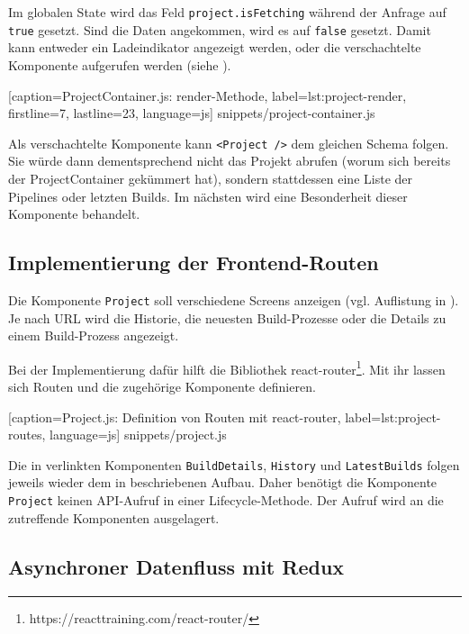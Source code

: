 Im globalen State wird das Feld \texttt{project.isFetching} während der Anfrage auf \texttt{true} gesetzt. Sind die Daten angekommen, wird es auf \texttt{false} gesetzt. Damit kann entweder ein Ladeindikator angezeigt werden, oder die verschachtelte Komponente aufgerufen werden (siehe ).


  [caption={ProjectContainer.js: render-Methode},
  label={lst:project-render},
  firstline=7,
  lastline=23,
  language=js]
  {snippets/project-container.js}

Als verschachtelte Komponente kann \texttt{<Project />} dem gleichen Schema folgen. Sie würde dann dementsprechend nicht das Projekt abrufen (worum sich bereits der ProjectContainer gekümmert hat), sondern stattdessen eine Liste der Pipelines oder letzten Builds. Im nächsten  wird eine Besonderheit dieser Komponente behandelt.

\subsection{Implementierung der Frontend-Routen}
\label{subsec:react-routes}

Die Komponente \texttt{Project} soll verschiedene Screens anzeigen (vgl. Auflistung in ). Je nach \acs{URL} wird die Historie, die neuesten Build-Prozesse oder die Details zu einem Build-Prozess angezeigt.

Bei der Implementierung dafür hilft die Bibliothek react-router\footnote{https://reacttraining.com/react-router/}. Mit ihr lassen sich Routen und die zugehörige Komponente definieren.


  [caption={Project.js: Definition von Routen mit react-router},
  label={lst:project-routes},
  language=js]
  {snippets/project.js}

Die in  verlinkten Komponenten \texttt{BuildDetails}, \texttt{History} und \texttt{Latest\-Builds} folgen jeweils wieder dem in  beschriebenen Aufbau. Daher benötigt die Komponente \texttt{Project} keinen API-Aufruf in einer Lifecycle-Methode. Der Aufruf wird an die zutreffende Komponenten ausgelagert.

\subsection{Asynchroner Datenfluss mit Redux}
\label{subsec:datenfluss-redux}


